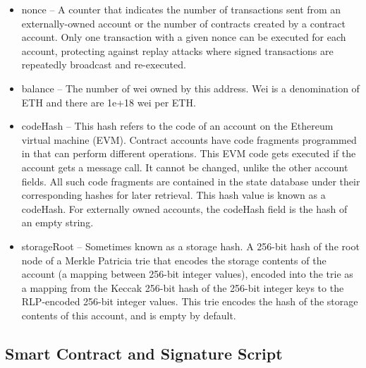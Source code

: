 \documentclass{article}
\begin{document}
\begin{itemize}
    \item nonce – A counter that indicates the number of transactions sent from an externally-owned account or the number of contracts created by a contract account. Only one transaction with a given nonce can be executed for each account, protecting against replay attacks where signed transactions are repeatedly broadcast and re-executed.
    \item balance – The number of wei owned by this address. Wei is a denomination of ETH and there are 1e+18 wei per ETH.
    \item codeHash – This hash refers to the code of an account on the Ethereum virtual machine (EVM). Contract accounts have code fragments programmed in that can perform different operations. This EVM code gets executed if the account gets a message call. It cannot be changed, unlike the other account fields. All such code fragments are contained in the state database under their corresponding hashes for later retrieval. This hash value is known as a codeHash. For externally owned accounts, the codeHash field is the hash of an empty string.
    \item storageRoot – Sometimes known as a storage hash. A 256-bit hash of the root node of a Merkle Patricia trie that encodes the storage contents of the account (a mapping between 256-bit integer values), encoded into the trie as a mapping from the Keccak 256-bit hash of the 256-bit integer keys to the RLP-encoded 256-bit integer values. This trie encodes the hash of the storage contents of this account, and is empty by default.
\end{itemize}

\subsection{Smart Contract and Signature Script}
\end{document}
